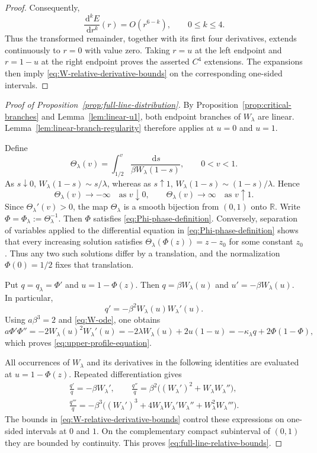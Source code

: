 \documentclass[12pt]{amsart}
\numberwithin{equation}{section}
\theoremstyle{plain}
\theoremstyle{definition}
\newcommand{\dd}{\,\mathrm d}
\begin{document}
\begin{proof}
Consequently,
\[
 \frac{\dd^kE}{\dd r^k}(r)=O(r^{6-k}),
 \qquad 0\le k\le4.
\]
Thus the transformed remainder, together with its first four derivatives,
extends continuously to $r=0$ with value zero.  Taking $r=u$ at the left
endpoint and $r=1-u$ at the right endpoint proves the asserted $C^4$
extensions.  The expansions then imply \eqref{eq:W-relative-derivative-bounds}
on the corresponding one-sided intervals.
\end{proof}

\begin{proof}[Proof of Proposition~\ref{prop:full-line-distribution}]
By Proposition~\ref{prop:critical-branches} and
Lemma~\ref{lem:linear-u1}, both endpoint branches of $W_{\lambda}$ are
linear.  Lemma~\ref{lem:linear-branch-regularity} therefore applies at
$u=0$ and $u=1$.

Define
\begin{equation*}
 \Theta_{\lambda}(v)=\int_{1/2}^{v}
 \frac{\dd s}{\beta W_{\lambda}(1-s)},
 \qquad 0<v<1.
\end{equation*}
As $s\downarrow0$,
$W_{\lambda}(1-s)\sim s/\lambda$, whereas as $s\uparrow1$,
$W_{\lambda}(1-s)\sim(1-s)/\lambda$.  Hence
\[
 \Theta_{\lambda}(v)\longrightarrow-\infty
 \quad\text{as }v\downarrow0,
 \qquad
 \Theta_{\lambda}(v)\longrightarrow\infty
 \quad\text{as }v\uparrow1.
\]
Since $\Theta_{\lambda}'(v)>0$, the map $\Theta_{\lambda}$ is a smooth bijection from
$(0,1)$ onto $\mathbb R$.  Write
$\Phi=\Phi_\lambda:=\Theta_{\lambda}^{-1}$.  Then \(\Phi\) satisfies
\eqref{eq:Phi-phase-definition}.  Conversely, separation of variables
applied to the differential equation in \eqref{eq:Phi-phase-definition}
shows that every increasing solution satisfies
$\Theta_{\lambda}(\Phi(z))=z-z_0$ for some constant $z_0$.  Thus any two such
solutions differ by a translation, and the normalization $\Phi(0)=1/2$
fixes that translation.

Put $q=q_\lambda=\Phi'$ and $u=1-\Phi(z)$.  Then
$q=\beta W_{\lambda}(u)$ and
$u'=-\beta W_{\lambda}(u)$.  In particular,
\[
 q'=-\beta^2W_{\lambda}(u)W_{\lambda}'(u).
\]
Using $a\beta^3=2$ and \eqref{eq:W-ode}, one obtains
\[
 a\Phi'\Phi''
 =-2W_{\lambda}(u)^2W_{\lambda}'(u)
 =-2\lambda W_{\lambda}(u)+2u(1-u)
 =-\kappa_{\lambda}q+2\Phi(1-\Phi),
\]
which proves \eqref{eq:upper-profile-equation}.

All occurrences of $W_{\lambda}$ and its derivatives in the following identities
are evaluated at $u=1-\Phi(z)$.  Repeated differentiation gives
\[
\begin{aligned}
 \frac{q'}q
 =-\beta W_{\lambda}',\qquad
 \frac{q''}q
 =\beta^2\bigl((W_{\lambda}')^2
   +W_{\lambda}W_{\lambda}''\bigr),\\
 \frac{q'''}q
 =-\beta^3\bigl((W_{\lambda}')^3
   +4W_{\lambda}W_{\lambda}'W_{\lambda}''
   +W_{\lambda}^2W_{\lambda}'''\bigr).
\end{aligned}
\]
The bounds in \eqref{eq:W-relative-derivative-bounds} control these
expressions on one-sided intervals at $0$ and $1$.  On the complementary
compact subinterval of $(0,1)$ they are bounded by continuity.  This proves
\eqref{eq:full-line-relative-bounds}.


\end{proof}
\end{document}
